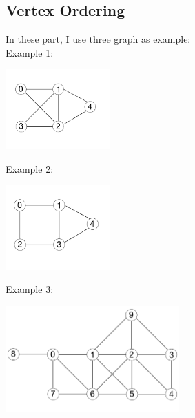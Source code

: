 \documentclass{article}
\begin{document}
\subsection{Vertex Ordering}
In these part, I use three graph as example: \\
Example 1: \\
    \begin{center}
        \includegraphics[width=0.3\textwidth]{p33.jpeg}
    \end{center}
Example 2: \\
    \begin{center}
        \includegraphics[width=0.3\textwidth]{p44.jpeg}
    \end{center}
Example 3: \\    
    \begin{center}
        \includegraphics[width=0.5\textwidth]{p55.jpeg}
    \end{center}  
\end{document}
